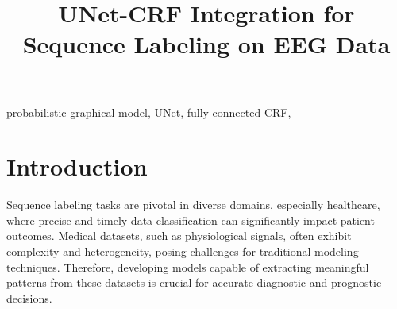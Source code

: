 \documentclass[conference]{IEEEtran}
\begin{document}
\title{\huge UNet-CRF Integration for Sequence Labeling on EEG Data}

\author{
\and
{}
\and
{}
}

\maketitle


\begin{abstract}




\end{abstract}


\begin{IEEEkeywords}


probabilistic graphical model, UNet, fully connected CRF,


\end{IEEEkeywords}


\section{Introduction}


Sequence labeling tasks are pivotal in diverse domains, especially healthcare,
where precise and timely data classification can significantly impact patient
outcomes. Medical datasets, such as physiological signals, often exhibit
complexity and heterogeneity, posing challenges for traditional modeling
techniques. Therefore, developing models capable of extracting meaningful
patterns from these datasets is crucial for accurate diagnostic and prognostic
decisions.
\end{document}

